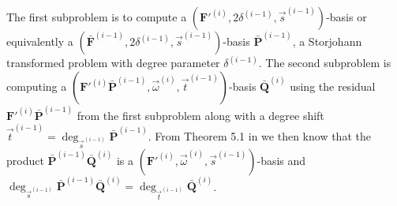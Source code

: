 The first subproblem is to compute a $(\mathbf{F}'^{\left(i\right)},2\delta^{\left(i-1\right)},\vec{s}^{\left(i-1\right)})$-basis
or equivalently a $(\bar{\mathbf{F}}^{\left(i-1\right)},2\delta^{\left(i-1\right)},\vec{s}^{\left(i-1\right)})$-basis
$\bar{\mathbf{P}}^{\left(i-1\right)}$, a Storjohann
transformed problem with degree parameter $\delta^{\left(i-1\right)}$.
The second subproblem is computing a $(\mathbf{F}'^{\left(i\right)}\bar{\mathbf{P}}^{\left(i-1\right)},\vec{\omega}^{\left(i\right)},\vec{t}^{\left(i-1\right)})$-basis
$\bar{\mathbf{Q}}^{\left(i\right)}$ using the residual $\mathbf{F}'^{\left(i\right)}\bar{\mathbf{P}}^{\left(i-1\right)}$
from the first subproblem along with a degree shift $\vec{t}^{\left(i-1\right)}=\deg_{\vec{s}^{\left(i-1\right)}}\bar{\mathbf{P}}^{\left(i-1\right)}$.
From Theorem 5.1 in \citep{BL1997} we then know that the product
$\bar{\mathbf{P}}^{\left(i-1\right)}\bar{\mathbf{Q}}^{\left(i\right)}$
is a $(\mathbf{F}'^{\left(i\right)},\vec{\omega}^{\left(i\right)},\vec{s}^{\left(i-1\right)})$-basis
and $\deg_{\vec{s}^{\left(i-1\right)}}\bar{\mathbf{P}}^{\left(i-1\right)}\bar{\mathbf{Q}}^{\left(i\right)}=\deg_{\vec{t}^{\left(i-1\right)}}\bar{\mathbf{Q}}^{\left(i\right)}$. 
